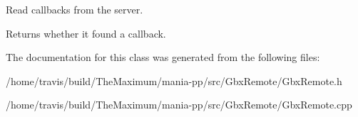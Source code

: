 Read callbacks from the server. 

Returns whether it found a callback. 

The documentation for this class was generated from the following files\-:\begin{DoxyCompactItemize}
\item 
/home/travis/build/\-The\-Maximum/mania-\/pp/src/\-Gbx\-Remote/Gbx\-Remote.\-h\item 
/home/travis/build/\-The\-Maximum/mania-\/pp/src/\-Gbx\-Remote/Gbx\-Remote.\-cpp\end{DoxyCompactItemize}
